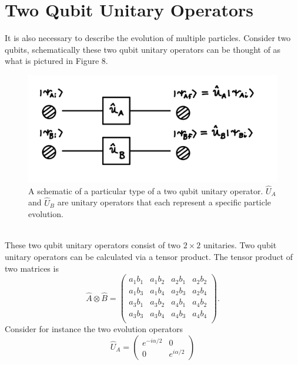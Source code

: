 \documentclass[twocolumn]{article}
\begin{document}
\section*{Two Qubit Unitary Operators}
It is also necessary to describe the evolution of multiple particles. Consider two qubits, schematically these two qubit unitary operators can be thought of as what is pictured in Figure 8.
\begin{figure}[htpb]
\begin{center}
\includegraphics[width=0.90\linewidth]{Two-Qubit-Unitary-Schematic.jpg}
\caption{A schematic of a particular type of a two qubit unitary operator. $\hat{U}_A$ and $\hat{U}_B$ are unitary operators that each represent a specific particle evolution.}
\end{center}
\end{figure}\\
These two qubit unitary operators consist of two $2\times2$ unitaries. Two qubit unitary operators can be calculated via a tensor product. The tensor product of two matrices is
\begin{equation} \label{eq:29}
\hat{A}\otimes\hat{B}=
\left(\begin{array}{cccc}
a_1b_1 & a_1b_2 & a_2b_1 & a_2b_2 \\
a_1b_3 & a_1b_4 & a_2b_3 & a_2b_4 \\
a_3b_1 & a_3b_2 & a_4b_1 & a_4b_2 \\
a_3b_3 & a_3b_4 & a_4b_3 & a_4b_4 \\
\end{array}\right).
\end{equation}
Consider for instance the two evolution operators
\begin{equation} \label{eq:30}
\hat{U}_A=
\begin{pmatrix}
e^{-i\alpha/2} & 0 \\
0 & e^{i\alpha/2}
\end{pmatrix}
\end{equation}
\end{document}
